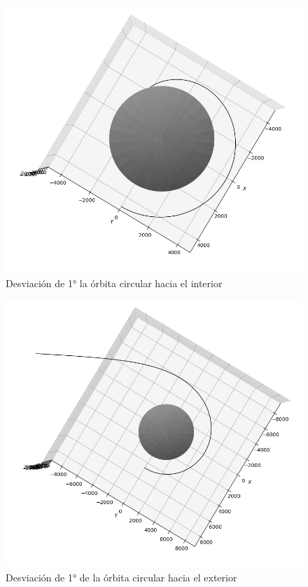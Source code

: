 \begin{figure}[h!]
    \centering
    \includegraphics[width=.8\textwidth]{Im/luz_interior_angulo91.png}
    \caption{Desviación de 1° la órbita circular hacia el interior}
\end{figure}

\begin{figure}[h!]
    \centering
    \includegraphics[width=.8\textwidth]{Im/luz_exterior_angulo89_1vuelta.png}
    \caption{Desviación de 1° de la órbita circular hacia el exterior}
\end{figure}

\newpage
